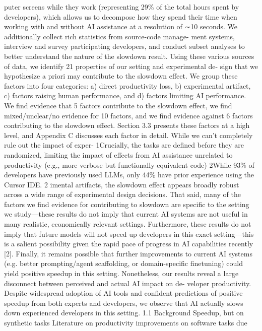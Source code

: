 puter screens while they work (representing 29\% of the total hours spent by developers), which
allows us to decompose how they spend their time when working with and without AI assistance
at a resolution of ∼10 seconds. We additionally collect rich statistics from source-code manage-
ment systems, interview and survey participating developers, and conduct subset analyses to better
understand the nature of the slowdown result.
Using these various sources of data, we identify 21 properties of our setting and experimental de-
sign that we hypothesize a priori may contribute to the slowdown effect. We group these factors
into four categories: a) direct productivity loss, b) experimental artifact, c) factors raising human
performance, and d) factors limiting AI performance. We find evidence that 5 factors contribute to
the slowdown effect, we find mixed/unclear/no evidence for 10 factors, and we find evidence against
6 factors contributing to the slowdown effect. Section 3.3 presents these factors at a high level, and
Appendix C discusses each factor in detail. While we can’t completely rule out the impact of exper-
1Crucially, the tasks are defined before they are randomized, limiting the impact of effects from AI assistance
unrelated to productivity (e.g., more verbose but functionally equivalent code)
2While 93\% of developers have previously used LLMs, only 44\% have prior experience using the Cursor
IDE.
2
imental artifacts, the slowdown effect appears broadly robust across a wide range of experimental
design decisions.
That said, many of the factors we find evidence for contributing to slowdown are specific to the
setting we study—these results do not imply that current AI systems are not useful in many realistic,
economically relevant settings. Furthermore, these results do not imply that future models will not
speed up developers in this exact setting—this is a salient possibility given the rapid pace of progress
in AI capabilities recently [2]. Finally, it remains possible that further improvements to current AI
systems (e.g. better prompting/agent scaffolding, or domain-specific finetuning) could yield positive
speedup in this setting.
Nonetheless, our results reveal a large disconnect between perceived and actual AI impact on de-
veloper productivity. Despite widespread adoption of AI tools and confident predictions of positive
speedup from both experts and developers, we observe that AI actually slows down experienced
developers in this setting.
1.1
Background
Speedup, but on synthetic tasks
Literature on productivity improvements on software tasks due
